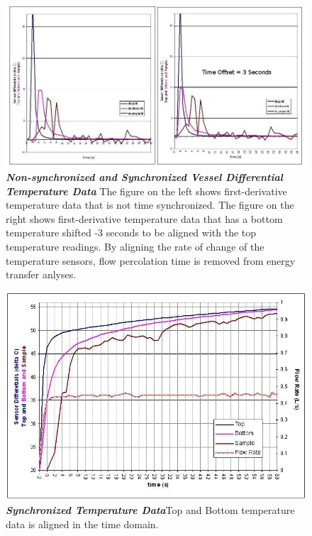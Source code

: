 \begin{landscape}
\begin{figure}
\begin{center}
\includegraphics[scale=.6]{sideBYsideSync.jpg}
\caption[Vessel Temperature Differences]{\textbf{\emph{Non-synchronized and Synchronized Vessel Differential Temperature Data}}  The figure on the left shows first-derivative temperature data that is not time synchronized. The figure on the right shows first-derivative temperature data that has a bottom temperature shifted -3 seconds to be aligned with the top temperature readings. By aligning the rate of change of the temperature sensors, flow percolation time is removed from energy transfer anlyses.\label{timeSync}}
\end{center}
\end{figure}
\end{landscape}

\begin{landscape}
\begin{figure}
\begin{center}
\includegraphics[scale=0.6]{timeSyncTemp.JPG}
\caption[Synchronized Temperature Data]{\textbf{\emph{Synchronized Temperature Data}}Top and Bottom temperature data is aligned in the time domain.\label{syncTemp}}
\end{center}
\end{figure}
\end{landscape}

